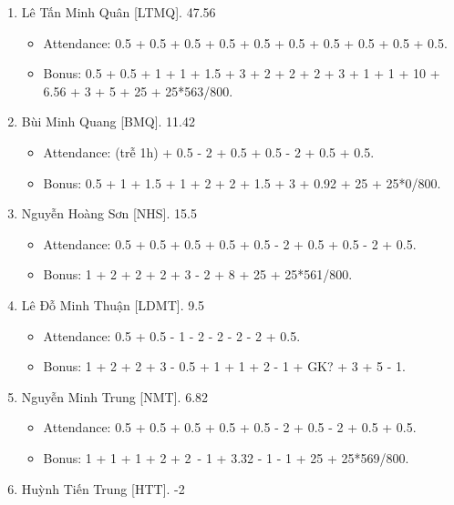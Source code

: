 \documentclass{article}
\begin{document}
\begin{enumerate}
    \begin{itemize}
        \item Attendance: 0.5 + 0.5 + 0.5 + 0.5 + 0.5 + 0.5 + 0.5 + 0.5.
        \item Bonus: 0.5 + 0.5 + 1 + 0.5 + 3 + 2 + 1 + 1.5 + 8.88 + 6.5 - 1 + 2 + 25 + 25*697/800 - 5 .
    \end{itemize}
    \item {\sc Lê Tấn Minh Quân [LTMQ].} 47.56    
    \begin{itemize}
        \item Attendance: 0.5 + 0.5 + 0.5 + 0.5 + 0.5 + 0.5 + 0.5 + 0.5 + 0.5 + 0.5.
        \item Bonus: 0.5 + 0.5 + 1 + 1 + 1.5 + 3 + 2 + 2 + 2 + 3 + 1 + 1 + 10 + 6.56 + 3 + 5 + 25 + 25*563/800.
    \end{itemize}
    \item {\sc Bùi Minh Quang [BMQ].} 11.42
    \begin{itemize}
        \item Attendance: (trễ 1h) + 0.5 - 2 + 0.5 + 0.5 - 2 + 0.5 + 0.5.
        \item Bonus: 0.5 + 1 + 1.5 + 1 + 2 + 2 + 1.5 + 3 + 0.92 + 25 + 25*0/800.
    \end{itemize}
    \item {\sc Nguyễn Hoàng Sơn [NHS].} 15.5
    \begin{itemize}
        \item Attendance: 0.5 + 0.5 + 0.5 + 0.5 + 0.5 - 2 + 0.5 + 0.5 - 2 + 0.5.
        \item Bonus: 1 + 2 + 2 + 2 + 3 - 2 + 8 + 25 + 25*561/800.
    \end{itemize}
    \item {\sc Lê Đỗ Minh Thuận [LDMT].} 9.5
    \begin{itemize}
        \item Attendance: 0.5 + 0.5 - 1 - 2 - 2 - 2 - 2 + 0.5.
        \item Bonus: 1 + 2 + 2 + 3 - 0.5 + 1 + 1 + 2 - 1 + GK? + 3 + 5 - 1.
    \end{itemize}
    \item {\sc Nguyễn Minh Trung [NMT].} 6.82
    \begin{itemize}
        \item Attendance: 0.5 + 0.5 + 0.5 + 0.5 + 0.5 - 2 + 0.5 - 2 + 0.5 + 0.5.
        \item Bonus: 1 + 1 + 1 + 2 + 2 - 1 + 3.32 - 1 - 1 + 25 + 25*569/800.
    \end{itemize}
    \item {\sc Huỳnh Tiến Trung [HTT].} -2

\end{enumerate}
\end{document}
